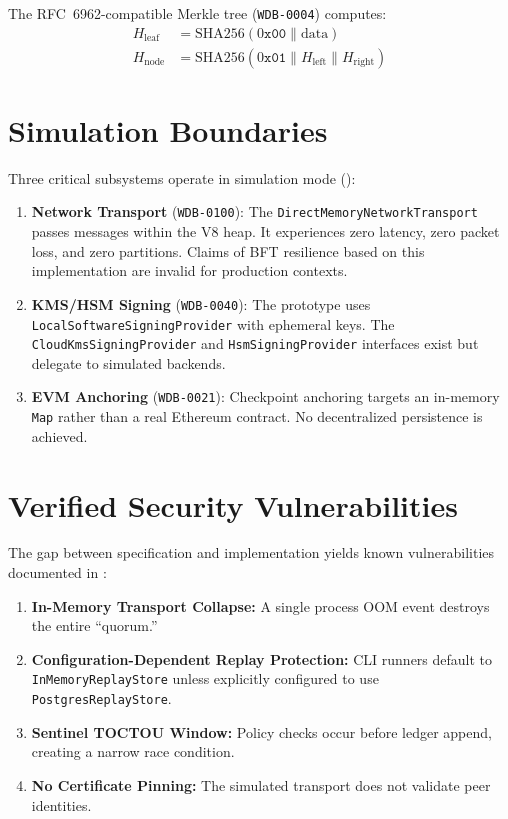 The RFC~6962-compatible Merkle tree (\texttt{WDB-0004}) computes:
\begin{align}
    H_{\text{leaf}} &= \text{SHA256}(0\texttt{x00} \parallel \text{data}) \\
    H_{\text{node}} &= \text{SHA256}(0\texttt{x01} \parallel H_{\text{left}} \parallel H_{\text{right}})
\end{align}

\section{Simulation Boundaries}
\label{app-sec:wdb-sim-boundaries}

Three critical subsystems operate in simulation mode ():

\begin{enumerate}
    \item \textbf{Network Transport} (\texttt{WDB-0100}): The \texttt{DirectMemoryNetworkTransport} passes messages within the V8 heap. It experiences zero latency, zero packet loss, and zero partitions. Claims of BFT resilience based on this implementation are invalid for production contexts.
    
    \item \textbf{KMS/HSM Signing} (\texttt{WDB-0040}): The prototype uses \texttt{LocalSoftwareSigningProvider} with ephemeral keys. The \texttt{CloudKmsSigningProvider} and \texttt{HsmSigningProvider} interfaces exist but delegate to simulated backends.
    
    \item \textbf{EVM Anchoring} (\texttt{WDB-0021}): Checkpoint anchoring targets an in-memory \texttt{Map} rather than a real Ethereum contract. No decentralized persistence is achieved.
\end{enumerate}

\section{Verified Security Vulnerabilities}
\label{app-sec:wdb-vulnerabilities}

The gap between specification and implementation yields known vulnerabilities documented in :
\begin{enumerate}
    \item \textbf{In-Memory Transport Collapse:} A single process OOM event destroys the entire ``quorum.''
    \item \textbf{Configuration-Dependent Replay Protection:} CLI runners default to \texttt{InMemoryReplayStore} unless explicitly configured to use \texttt{PostgresReplayStore}.
    \item \textbf{Sentinel TOCTOU Window:} Policy checks occur before ledger append, creating a narrow race condition.
    \item \textbf{No Certificate Pinning:} The simulated transport does not validate peer identities.
\end{enumerate}

